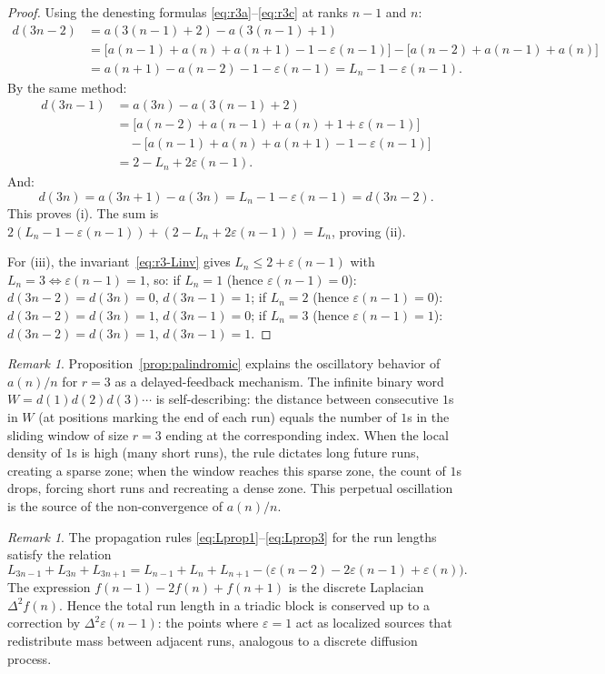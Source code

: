 \documentclass[12pt]{article}
\theoremstyle{definition}
\theoremstyle{remark}
\newtheorem{remark}[theorem]{Remark}
\begin{document}
\begin{proof}
Using the denesting formulas \eqref{eq:r3a}--\eqref{eq:r3c}
at ranks $n-1$ and $n$:
\begin{align*}
  d(3n-2) &= a(3(n{-}1){+}2)-a(3(n{-}1){+}1) \\
          &= \bigl[a(n{-}1)+a(n)+a(n{+}1)-1-\varepsilon(n{-}1)\bigr]
             - \bigl[a(n{-}2)+a(n{-}1)+a(n)\bigr]\\
          &= a(n{+}1)-a(n{-}2)-1-\varepsilon(n{-}1) = L_n-1-\varepsilon(n{-}1).
\end{align*}
By the same method:
\begin{align*}
  d(3n-1) &= a(3n)-a(3(n{-}1){+}2) \\
          &= \bigl[a(n{-}2)+a(n{-}1)+a(n)+1+\varepsilon(n{-}1)\bigr]\\
          &\quad - \bigl[a(n{-}1)+a(n)+a(n{+}1)-1-\varepsilon(n{-}1)\bigr]\\
          &= 2-L_n+2\varepsilon(n{-}1).
\end{align*}
And:
\[
  d(3n) = a(3n{+}1)-a(3n) = L_n-1-\varepsilon(n{-}1) = d(3n{-}2).
\]
This proves (i). The sum is
$2(L_n-1-\varepsilon(n{-}1))+(2-L_n+2\varepsilon(n{-}1))=L_n$,
proving (ii).

For (iii), the invariant~\eqref{eq:r3-Linv} gives $L_n\le 2+\varepsilon(n{-}1)$
with $L_n=3\iff\varepsilon(n{-}1)=1$, so:
if $L_n=1$ (hence $\varepsilon(n{-}1)=0$): $d(3n{-}2)=d(3n)=0$, $d(3n{-}1)=1$;
if $L_n=2$ (hence $\varepsilon(n{-}1)=0$): $d(3n{-}2)=d(3n)=1$, $d(3n{-}1)=0$;
if $L_n=3$ (hence $\varepsilon(n{-}1)=1$): $d(3n{-}2)=d(3n)=1$, $d(3n{-}1)=1$.
\end{proof}

\begin{remark}\label{rem:oscillator}
Proposition~\ref{prop:palindromic} explains the oscillatory behavior of
$a(n)/n$ for $r=3$ as a delayed-feedback mechanism.
The infinite binary word $W=d(1)d(2)d(3)\cdots$ is self-describing:
the distance between consecutive $1$s in $W$ (at positions marking the
end of each run) equals the number of $1$s in the
sliding window of size $r=3$ ending at the corresponding index.
When the local density of $1$s is high (many short runs),
the rule dictates long future runs, creating a sparse zone;
when the window reaches this sparse zone, the count of $1$s drops,
forcing short runs and recreating a dense zone.
This perpetual oscillation is the source of the non-convergence of $a(n)/n$.
\end{remark}

\begin{remark}\label{rem:laplacian}
The propagation rules \eqref{eq:Lprop1}--\eqref{eq:Lprop3}
for the run lengths satisfy the relation
\[
  L_{3n-1}+L_{3n}+L_{3n+1}
  = L_{n-1}+L_n+L_{n+1}
    - \bigl(\varepsilon(n{-}2)-2\varepsilon(n{-}1)+\varepsilon(n)\bigr).
\]
The expression $f(n{-}1)-2f(n)+f(n{+}1)$ is the discrete Laplacian
$\Delta^2 f(n)$. Hence the total run length in a triadic block
is conserved up to a correction by $\Delta^2\varepsilon(n{-}1)$:
the points where $\varepsilon=1$ act as localized sources that
redistribute mass between adjacent runs, analogous to a discrete
diffusion process.
\end{remark}
\end{document}
